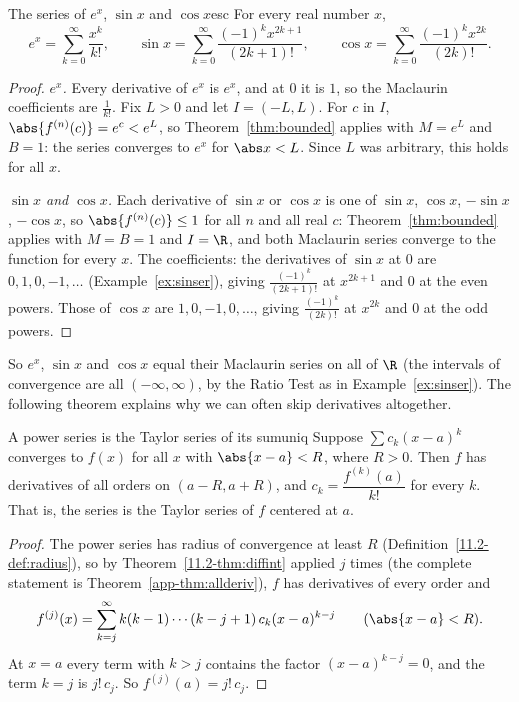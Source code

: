 \documentclass[11pt]{article}
\begin{document}
\begin{thm}{The series of $e^x$, $\sin x$ and $\cos x$}{esc}
For every real number $x$,
\[
e^x=\sum_{k=0}^\infty\frac{x^k}{k!},\qquad\sin x=\sum_{k=0}^\infty\frac{(-1)^kx^{2k+1}}{(2k+1)!},\qquad\cos x=\sum_{k=0}^\infty\frac{(-1)^kx^{2k}}{(2k)!}.
\]
\end{thm}
\begin{proof}
\emph{$e^x$.} Every derivative of $e^x$ is $e^x$, and at $0$ it is $1$, so the Maclaurin coefficients are $\frac1{k!}$. Fix $L>0$ and let $I=(-L,L)$. For $c$ in $I$, $\abs{f^{(n)}(c)}=e^c<e^L$, so Theorem~\ref{thm:bounded} applies with $M=e^L$ and $B=1$: the series converges to $e^x$ for $\abs x<L$. Since $L$ was arbitrary, this holds for all $x$.

\emph{$\sin x$ and $\cos x$.} Each derivative of $\sin x$ or $\cos x$ is one of $\sin x$, $\cos x$, $-\sin x$, $-\cos x$, so $\abs{f^{(n)}(c)}\le1$ for all $n$ and all real $c$: Theorem~\ref{thm:bounded} applies with $M=B=1$ and $I=\R$, and both Maclaurin series converge to the function for every $x$. The coefficients: the derivatives of $\sin x$ at $0$ are $0,1,0,-1,\dots$ (Example~\ref{ex:sinser}), giving $\frac{(-1)^k}{(2k+1)!}$ at $x^{2k+1}$ and $0$ at the even powers. Those of $\cos x$ are $1,0,-1,0,\dots$, giving $\frac{(-1)^k}{(2k)!}$ at $x^{2k}$ and $0$ at the odd powers.
\end{proof}

So $e^x$, $\sin x$ and $\cos x$ equal their Maclaurin series on all of $\R$ (the intervals of convergence are all $(-\infty,\infty)$, by the Ratio Test as in Example~\ref{ex:sinser}). The following theorem explains why we can often skip derivatives altogether.

\begin{thm}{A power series is the Taylor series of its sum}{uniq}
Suppose $\sum c_k(x-a)^k$ converges to $f(x)$ for all $x$ with $\abs{x-a}<R$, where $R>0$. Then $f$ has derivatives of all orders on $(a-R,a+R)$, and $c_k=\dfrac{f^{(k)}(a)}{k!}$ for every $k$. That is, the series is the Taylor series of $f$ centered at $a$.
\end{thm}
\begin{proof}
The power series has radius of convergence at least $R$ (Definition~\ref{11.2-def:radius}), so by Theorem~\ref{11.2-thm:diffint} applied $j$ times (the complete statement is Theorem~\ref{app-thm:allderiv}), $f$ has derivatives of every order and
\[
f^{(j)}(x)=\sum_{k=j}^\infty k(k-1)\cdots(k-j+1)\,c_k(x-a)^{k-j}\qquad(\abs{x-a}<R).
\]
At $x=a$ every term with $k>j$ contains the factor $(x-a)^{k-j}=0$, and the term $k=j$ is $j!\,c_j$. So $f^{(j)}(a)=j!\,c_j$.
\end{proof}
\end{document}
